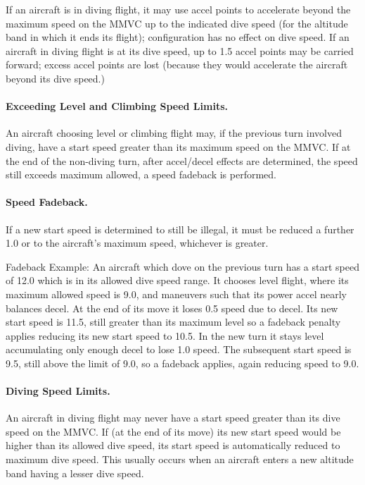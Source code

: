 If an aircraft is in diving flight, it may use accel points to accelerate beyond the maximum speed on the MMVC up to the indicated dive speed (for the altitude band in which it ends its flight); configuration has no effect on dive speed. If an aircraft in diving flight is at its dive speed, up to 1.5 accel points may be carried forward; excess accel points are lost (because they would accelerate the aircraft beyond its dive speed.)

\paragraph{Exceeding Level and Climbing Speed Limits.} An aircraft choosing level or climbing flight may, if the previous turn involved diving, have a start speed greater than its maximum speed on the MMVC. If at the end of the non-diving turn, after accel/decel effects are determined, the speed still exceeds maximum allowed, a speed fadeback is performed.

\paragraph{Speed Fadeback.} If a new start speed is determined to still be illegal, it must be reduced a further 1.0 or to the aircraft's maximum speed, whichever is greater.

Fadeback Example: An aircraft which dove on the previous turn has a start speed of 12.0 which is in its allowed dive speed range. It chooses level flight, where its maximum allowed speed is 9.0, and maneuvers such that its power accel nearly balances decel. At the end of its move it loses 0.5 speed due to decel. Its new start speed is 11.5, still greater than its maximum level so a fadeback penalty applies reducing its new start speed to 10.5. In the new turn it stays level accumulating only enough decel to lose 1.0 speed. The subsequent start speed is 9.5, still above the limit of 9.0, so a fadeback applies, again reducing speed to 9.0.

\paragraph{Diving Speed Limits.} An aircraft in diving flight may never have a start speed greater than its dive speed on the MMVC. If (at the end of its move) its new start speed would be higher than its allowed dive speed, its start speed is automatically reduced to maximum dive speed. This usually occurs when an aircraft enters a new altitude band having a lesser dive speed.

